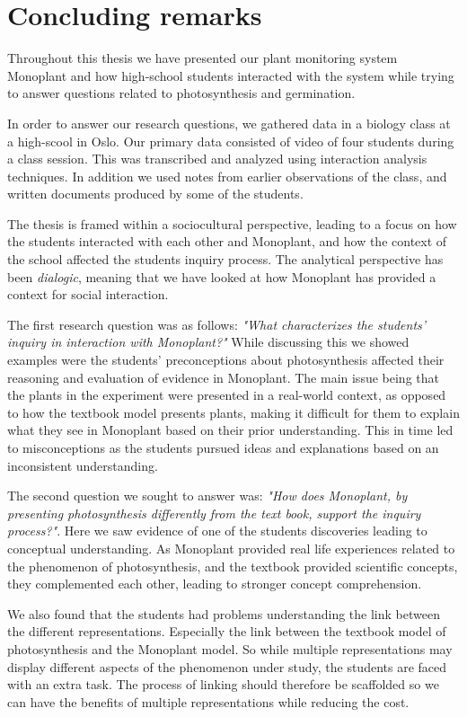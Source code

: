 \chapter{Concluding remarks}
Throughout this thesis we have presented our plant monitoring system Monoplant and how high-school students interacted with the system while trying to answer questions related to photosynthesis and germination. 

In order to answer our research questions, we gathered data in a biology class at a high-scool in Oslo. Our primary data consisted of video of four students during a class session. This was transcribed and analyzed using interaction analysis techniques. In addition we used notes from earlier observations of the class, and written documents produced by some of the students. 

The thesis is framed within a sociocultural perspective, leading to a focus on how the students interacted with each other and Monoplant, and how the context of the school affected the students inquiry process. The analytical perspective has been \emph{dialogic}, meaning that we have looked at how Monoplant has provided a context for social interaction. 

The first research question was as follows: \emph{"What characterizes the students’ inquiry in interaction with Monoplant?"} While discussing this we showed examples were the students' preconceptions about photosynthesis affected their reasoning and evaluation of evidence in Monoplant. The main issue being that the plants in the experiment were presented in a real-world context, as opposed to how the textbook model presents plants, making it difficult for them to explain what they see in Monoplant based on their prior understanding. This in time led to misconceptions as the students pursued ideas and explanations based on an inconsistent understanding.


The second question we sought to answer was: \emph{"How does Monoplant, by presenting photosynthesis differently from the text book, support the inquiry process?"}. Here we saw evidence of one of the students discoveries leading to conceptual understanding. As Monoplant provided real life experiences related to the phenomenon of photosynthesis, and the textbook provided scientific concepts, they complemented each other, leading to stronger concept comprehension. 

We also found that the students had problems understanding the link between the different representations. Especially the link between the textbook model of photosynthesis and the Monoplant model. So while multiple representations may display different aspects of the phenomenon under study, the students are faced with an extra task. The process of linking should therefore be scaffolded so we can have the benefits of multiple representations while reducing the cost. 

